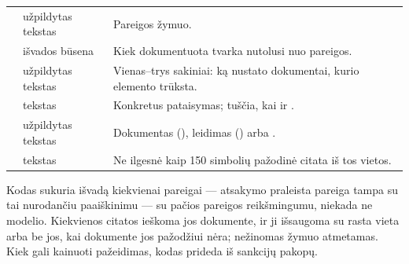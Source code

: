 \par\nopagebreak
\begin{xltabular}{\textwidth}{@{}L{44mm}L{28mm}Y@{}}
\toprule
{} &  &  \\
\midrule
\endhead
\bottomrule
\endlastfoot
{} & užpildytas tekstas & Pareigos žymuo. \\
 & išvados būsena & Kiek dokumentuota tvarka nutolusi nuo pareigos. \\
 & užpildytas tekstas & Vienas--trys sakiniai: ką nustato dokumentai, kurio elemento trūksta. \\
 & tekstas & Konkretus pataisymas; tuščia, kai  ir . \\
 & užpildytas tekstas & Dokumentas (), leidimas () arba . \\
 & tekstas & Ne ilgesnė kaip 150 simbolių pažodinė citata iš tos vietos. \\
\end{xltabular}

Kodas sukuria išvadą kiekvienai pareigai --- atsakymo praleista pareiga tampa  su
tai nurodančiu paaiškinimu --- su pačios pareigos reikšmingumu, niekada ne modelio. Kiekvienos
citatos ieškoma jos dokumente, ir ji išsaugoma su rasta vieta arba be jos, kai dokumente jos
pažodžiui nėra; nežinomas žymuo atmetamas. Kiek gali kainuoti pažeidimas, kodas prideda iš
sankcijų pakopų.

